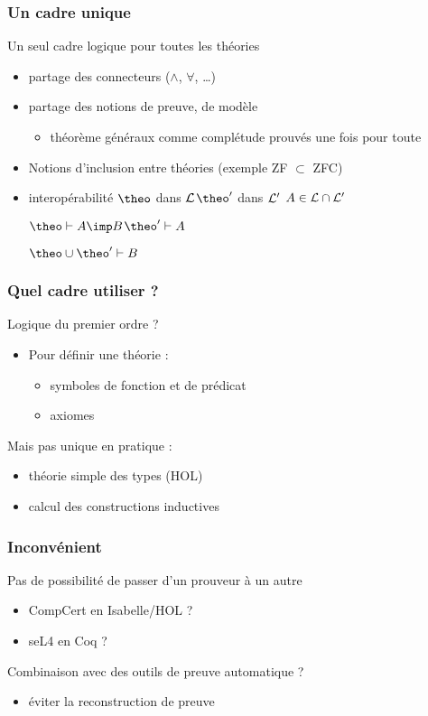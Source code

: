 \documentclass[12pt,aspectratio=169]{beamer}
\begin{document}
\begin{frame}
  \frametitle{Un cadre unique}
  Un seul cadre logique pour toutes les théories
  \begin{itemize}
  \item partage des connecteurs ($\wedge$, $\forall$, \dots)
  \item partage des notions de preuve, de modèle
    \begin{itemize}
    \item théorème généraux comme complétude prouvés une fois pour
      toute
    \end{itemize}
    \medskip

  \item Notions d'inclusion entre théories (exemple ZF $\subset$ ZFC)
    \medskip

  \item interopérabilité
    $\theo$ dans $\cal L$\qquad$\theo'$ dans $\cal L'$\qquad
    $A\in \cal L\cap \cal L'$
    \medskip
    
    $\theo \vdash A\imp B$\qquad $\theo'\vdash A$

    \qquad $\theo\cup\theo'\vdash B$
  \end{itemize}
\end{frame}

\begin{frame}
  \frametitle{Quel cadre utiliser ?}

  Logique du premier ordre ?
  \begin{itemize}
  \item Pour définir une théorie :
    \begin{itemize}
    \item symboles de fonction et de prédicat
    \item axiomes
    \end{itemize}
  \end{itemize}
  \medskip
  
  Mais pas unique en pratique :
  \begin{itemize}
  \item théorie simple des types (HOL)
  \item calcul des constructions inductives
  \end{itemize}
\end{frame}

\begin{frame}
  \frametitle{Inconvénient}
  Pas de possibilité de passer d'un prouveur à un autre
  \begin{itemize}
  \item CompCert en Isabelle/HOL ?
  \item seL4 en Coq ?
  \end{itemize}
  \bigskip
  
  Combinaison avec des outils de preuve automatique ?
  \begin{itemize}
  \item éviter la reconstruction de preuve
  \end{itemize}
\end{frame}
\end{document}
